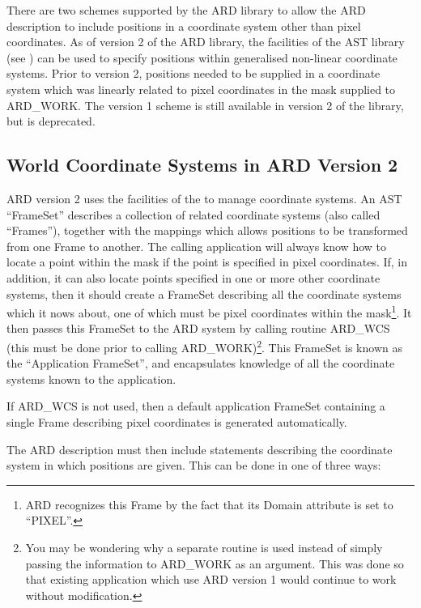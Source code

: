 There are two schemes supported by the ARD library to allow the ARD 
description to include positions in a coordinate system other than pixel 
coordinates. As of version 2 of the ARD library, the facilities of the
AST library (see ) can be used to specify
positions within generalised non-linear coordinate systems. Prior to 
version 2, positions needed to be supplied in a coordinate system which
was linearly related to pixel coordinates in the mask supplied to
ARD\_WORK. The version 1 scheme is still available in version 2 of the
library, but is deprecated.

\subsection{World Coordinate Systems in ARD Version 2}

ARD version 2 uses the facilities of the  to
manage coordinate systems. An AST ``FrameSet'' describes a collection of
related coordinate systems (also called ``Frames''), together with the
mappings which allows positions to be transformed from one Frame to
another. The calling application will always know how to locate a point
within the mask if the point is specified in pixel coordinates. If, in
addition, it can also locate points specified in one or more other
coordinate systems, then it should create a FrameSet describing all the
coordinate systems which it nows about, one of which must be pixel
coordinates within the mask\footnote{ARD recognizes this Frame by the
fact that its Domain attribute is set to ``PIXEL''.}. It then passes this
FrameSet to the ARD system by calling routine ARD\_WCS (this must be done
prior to calling ARD\_WORK)\footnote{You may be wondering why a separate
routine is used instead of simply passing the information to ARD\_WORK as
an argument. This was done so that existing application which use ARD
version 1 would continue to work without modification.}. This FrameSet is
known as the ``Application FrameSet'', and encapsulates knowledge of all
the coordinate systems known to the application. 

If ARD\_WCS is not used, then a default application FrameSet containing a
single Frame describing pixel coordinates is generated automatically.

The ARD description must then include statements describing the 
coordinate system in which positions are given. This can be done in one
of three ways:


